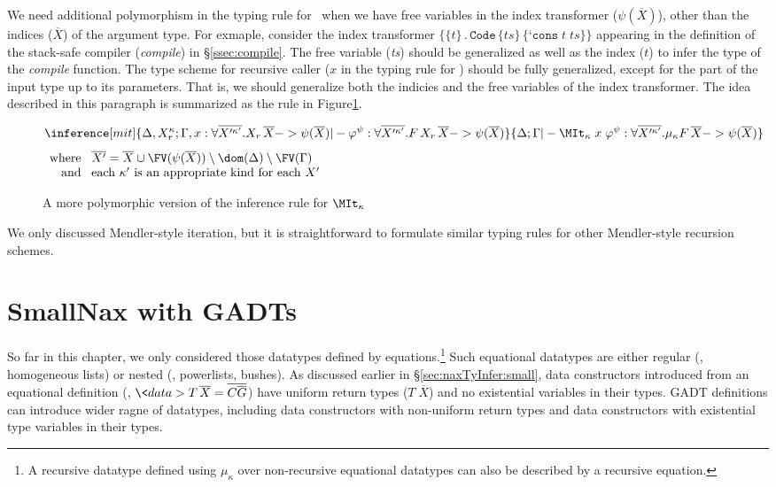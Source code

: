 We need additional polymorphism in the typing rule for \MIt\ when we have free
variables in the index transformer ($\psi(\overline{X})$), other than
the indices ($\overline{X}$) of the argument type. For exmaple, consider
the index transformer $\{\{t\}\,.\,
   \texttt{Code}\,\{\textit{ts}\}\,\{\texttt{`cons}\;t\;\textit{ts}\}\}$
appearing in the definition of the stack-safe compiler (\textit{compile})
in \S\ref{ssec:compile}. The free variable (\textit{ts}) should be generalized
as well as the index ($t$) to infer the type of the \textit{compile} function.
The type scheme for recursive caller ($x$ in the typing rule for \MIt)
should be fully generalized, except for the part of the input type
up to its parameters. That is, we should generalize both the indicies
and the free variables of the index transformer. The idea described
in this paragraph is summarized as the rule 
in Figure\;\ref{fig:SmallNaxRecGen}.

\begin{figure}
\begin{singlespace}
\centering
\[ \inference[\sc mit]{
	\Delta,X_r^\kappa;
	\Gamma,x:\forall\overline{X'^{\kappa'}}.X_r\,\overline{X} -> \psi(\overline{X})
	|- \varphi^\psi :
	\forall\overline{X'^{\kappa'}}.F\,X_r\,\overline{X} -> \psi(\overline{X})
	}{ \Delta;\Gamma |- \MIt_\kappa\;x\;\varphi^\psi:
	\forall\overline{X'^{\kappa'}}.\mu_\kappa F\,\overline{X} -> \psi(\overline{X}) }
\]
$\begin{array}{rl}
\text{where}\!& \overline{X'} = \overline{X} \cup \FV(\psi(\overline{X}))
				\setminus \dom(\Delta) \setminus \FV(\Gamma) \\
\text{and}\!& \text{each $\kappa'$ is an appropriate kind for each $X'$}
\end{array}$
\end{singlespace}
\caption{A more polymorphic version of the inference rule for $\MIt_\kappa$}
\label{fig:SmallNaxRecGen}
\end{figure}

We only discussed Mendler-style iteration, but it is straightforward to
formulate similar typing rules for other Mendler-style recursion schemes.

\section{SmallNax with GADTs}
\label{sec:naxTyInfer:gadt}
So far in this chapter, we only considered those datatypes defined
by equations.\footnote{A recursive datatype defined using $\mu_\kappa$
over non-recursive equational datatypes can also be described by
a recursive equation.} Such equational datatypes are either regular
(\eg, homogeneous lists) or nested (\eg, powerlists, bushes).
As discussed earlier in \S\ref{sec:naxTyInfer:small}, data constructors
introduced from an equational definition
(\ie, $\<data> T\,\overline{X} = \overline{C \overline{G}}$) have
uniform return types ($T\;\overline{X}$) and no existential variables
in their types. GADT definitions can introduce wider ragne of datatypes,
including data constructors with non-uniform return types and data constructors
with existential type variables in their types.

